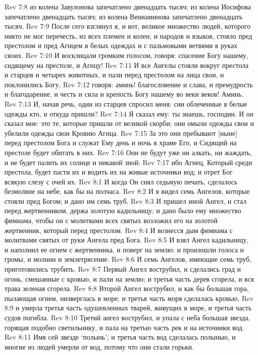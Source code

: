 Rev 7:8  из колена Завулонова запечатлено двенадцать тысяч; из колена Иосифова запечатлено двенадцать тысяч; из колена Вениаминова запечатлено двенадцать тысяч.
Rev 7:9  После сего взглянул я, и вот, великое множество людей, которого никто не мог перечесть, из всех племен и колен, и народов и языков, стояло пред престолом и пред Агнцем в белых одеждах и с пальмовыми ветвями в руках своих.
Rev 7:10  И восклицали громким голосом, говоря: спасение Богу нашему, сидящему на престоле, и Агнцу!
Rev 7:11  И все Ангелы стояли вокруг престола и старцев и четырех животных, и пали перед престолом на лица свои, и поклонились Богу,
Rev 7:12  говоря: аминь! благословение и слава, и премудрость и благодарение, и честь и сила и крепость Богу нашему во веки веков! Аминь.
Rev 7:13  И, начав речь, один из старцев спросил меня: сии облеченные в белые одежды кто, и откуда пришли?
Rev 7:14  Я сказал ему: ты знаешь, господин. И он сказал мне: это те, которые пришли от великой скорби; они омыли одежды свои и убелили одежды свои Кровию Агнца.
Rev 7:15  За это они пребывают [ныне] перед престолом Бога и служат Ему день и ночь в храме Его, и Сидящий на престоле будет обитать в них.
Rev 7:16  Они не будут уже ни алкать, ни жаждать, и не будет палить их солнце и никакой зной:
Rev 7:17  ибо Агнец, Который среди престола, будет пасти их и водить их на живые источники вод; и отрет Бог всякую слезу с очей их.
Rev 8:1  И когда Он снял седьмую печать, сделалось безмолвие на небе, как бы на полчаса.
Rev 8:2  И я видел семь Ангелов, которые стояли пред Богом; и дано им семь труб.
Rev 8:3  И пришел иной Ангел, и стал перед жертвенником, держа золотую кадильницу; и дано было ему множество фимиама, чтобы он с молитвами всех святых возложил его на золотой жертвенник, который перед престолом.
Rev 8:4  И вознесся дым фимиама с молитвами святых от руки Ангела пред Бога.
Rev 8:5  И взял Ангел кадильницу, и наполнил ее огнем с жертвенника, и поверг на землю: и произошли голоса и громы, и молнии и землетрясение.
Rev 8:6  И семь Ангелов, имеющие семь труб, приготовились трубить.
Rev 8:7  Первый Ангел вострубил, и сделались град и огонь, смешанные с кровью, и пали на землю; и третья часть дерев сгорела, и вся трава зеленая сгорела.
Rev 8:8  Второй Ангел вострубил, и как бы большая гора, пылающая огнем, низверглась в море; и третья часть моря сделалась кровью,
Rev 8:9  и умерла третья часть одушевленных тварей, живущих в море, и третья часть судов погибла.
Rev 8:10  Третий ангел вострубил, и упала с неба большая звезда, горящая подобно светильнику, и пала на третью часть рек и на источники вод.
Rev 8:11  Имя сей звезде `полынь'; и третья часть вод сделалась полынью, и многие из людей умерли от вод, потому что они стали горьки.
